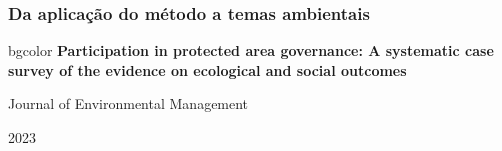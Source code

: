 \usetikzlibrary{positioning, arrows.meta}



\begin{frame}
    \frametitle{Da aplicação do método a temas ambientais}
    \vspace{-0.8em}
    \begin{center}
    \begin{beamercolorbox}[center, wd=10.5cm]{bgcolor}
        \textcolor{myblue}{\textbf{Participation in protected area governance:  A systematic case survey of the evidence on ecological and social outcomes }}
    \end{beamercolorbox}
    
    \vspace{1cm}
    
    \centerline{Journal of Environmental Management}

    \vspace{0.2cm}

    \centerline{2023}
   
    \end{center}
\end{frame}